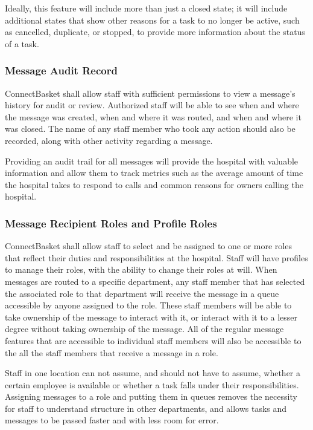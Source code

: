 \documentclass[onecolumn, draftclsnofoot,10pt, compsoc]{IEEEtran}
\begin{document}
Ideally, this feature will include more than just a closed state; it will include additional states that show other reasons for a task to no longer be active, such as cancelled, duplicate, or stopped, to provide more information about the status of a task.

\subsubsection{Message Audit Record}
ConnectBasket shall allow staff with sufficient permissions to view a message's  history for audit or review. Authorized staff will  be able to see when and where the message was created, when and where it was routed, and when and where it was closed. The name of any staff member who took any action should also be recorded, along with other activity regarding a message. 

Providing an audit trail for all messages will provide the hospital with valuable information and allow them to track metrics such as the average amount of time the hospital takes to respond to calls and common reasons for owners calling the hospital. 

\subsubsection{Message Recipient Roles and Profile Roles}
ConnectBasket shall allow staff to select and be assigned to one or more roles that reflect their duties and responsibilities at the hospital. Staff will have profiles to manage their roles, with the ability to change their roles at will. When messages are routed to a specific department, any staff member that has selected the associated role to that department will receive the message in a queue accessible by anyone assigned to the role. These staff members will be able to take ownership of the message to interact with it, or interact with it to a lesser degree without taking ownership of the message. All of the regular message features that are accessible to individual staff members will also be accessible to the all the staff members that receive a message in a role. 

Staff in one location can not assume, and should not have to assume, whether a certain employee is available or whether a task falls under their responsibilities. Assigning messages to a role and putting them in queues removes the necessity for staff to understand structure in other departments, and allows tasks and messages to be passed faster and with less room for error.
\end{document}
